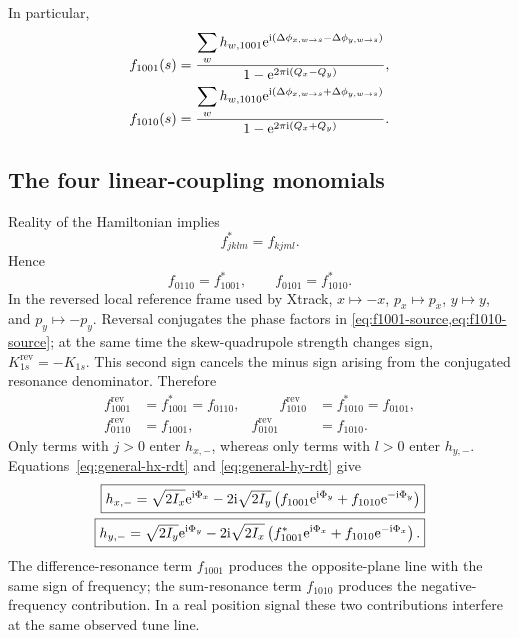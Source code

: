 In particular,
\begin{align}
 f_{1001}(s)&=
 \frac{\displaystyle\sum_w h_{w,1001}
 \mathrm{e}^{\mathrm{i}(\Delta\phi_{x,w\to s}-\Delta\phi_{y,w\to s})}}
 {1-\mathrm{e}^{2\pi\mathrm{i}(Q_x-Q_y)}},
 \label{eq:f1001-source}\\
 f_{1010}(s)&=
 \frac{\displaystyle\sum_w h_{w,1010}
 \mathrm{e}^{\mathrm{i}(\Delta\phi_{x,w\to s}+\Delta\phi_{y,w\to s})}}
 {1-\mathrm{e}^{2\pi\mathrm{i}(Q_x+Q_y)}}.
 \label{eq:f1010-source}
\end{align}

\subsection{The four linear-coupling monomials}

Reality of the Hamiltonian implies
\begin{equation}
 f_{jklm}^{*}=f_{kjml}.
\end{equation}
Hence
\begin{equation}
 \boxed{
 f_{0110}=f_{1001}^{*},
 \qquad
 f_{0101}=f_{1010}^{*}.
 }
 \label{eq:rdt-conjugates}
\end{equation}
In the reversed local reference frame used by Xtrack,
$x\mapsto-x$, $p_x\mapsto p_x$, $y\mapsto y$, and $p_y\mapsto-p_y$.
Reversal conjugates the phase factors in \cref{eq:f1001-source,eq:f1010-source};
at the same time the skew-quadrupole strength changes sign,
$K_{1s}^{\mathrm{rev}}=-K_{1s}$.  This second sign cancels the minus sign
arising from the conjugated resonance denominator.  Therefore
\begin{equation}
 \begin{aligned}
 f_{1001}^{\mathrm{rev}}&=f_{1001}^{*}=f_{0110},
 &\qquad f_{1010}^{\mathrm{rev}}&=f_{1010}^{*}=f_{0101},\\
 f_{0110}^{\mathrm{rev}}&=f_{1001},
 & f_{0101}^{\mathrm{rev}}&=f_{1010}.
 \end{aligned}
 \label{eq:rdt-reverse}
\end{equation}
Only terms with $j>0$ enter $h_{x,-}$, whereas only terms with $l>0$ enter
$h_{y,-}$.  Equations~\eqref{eq:general-hx-rdt} and
\eqref{eq:general-hy-rdt} give
\begin{align}
 \boxed{
 h_{x,-}=\sqrt{2I_x}\mathrm{e}^{\mathrm{i}\Phi_x}
 -2\mathrm{i}\sqrt{2I_y}
 \left(f_{1001}\mathrm{e}^{\mathrm{i}\Phi_y}+f_{1010}\mathrm{e}^{-\mathrm{i}\Phi_y}\right)
 }
 \label{eq:hx-linear-coupling}\\
 \boxed{
 h_{y,-}=\sqrt{2I_y}\mathrm{e}^{\mathrm{i}\Phi_y}
 -2\mathrm{i}\sqrt{2I_x}
 \left(f_{1001}^{*}\mathrm{e}^{\mathrm{i}\Phi_x}+f_{1010}\mathrm{e}^{-\mathrm{i}\Phi_x}\right).
 }
 \label{eq:hy-linear-coupling}
\end{align}
The difference-resonance term $f_{1001}$ produces the opposite-plane line with the same sign of frequency; the sum-resonance term $f_{1010}$ produces the negative-frequency contribution.  In a real position signal these two contributions interfere at the same observed tune line.

